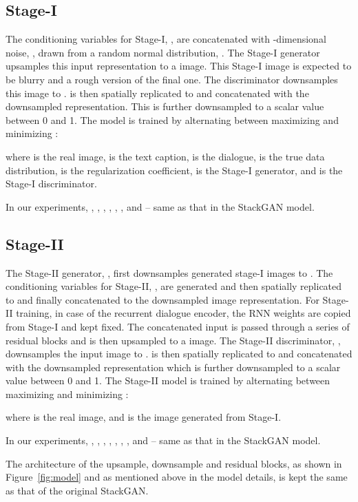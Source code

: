 \documentclass{article}
\begin{document}
\subsection{Stage-I}
The conditioning variables for Stage-I, , are concatenated with -dimensional noise, , drawn from a random normal distribution, . The Stage-I generator upsamples this input representation to a  image. This Stage-I image is expected to be blurry and a rough version of the final one. The discriminator downsamples this image to .  is then spatially replicated to  and concatenated with the downsampled representation. This is further downsampled to a scalar value between 0 and 1. The model is trained by alternating between maximizing  and minimizing :

where  is the real image,  is the text caption,  is the dialogue,  is the true data distribution,  is the regularization coefficient,  is the Stage-I generator, and  is the Stage-I discriminator.

In our experiments, , , , , , , and  -- same as that in the StackGAN model.

\subsection{Stage-II}
The Stage-II generator, , first downsamples generated stage-I images to . The conditioning variables for Stage-II, , are generated and then spatially replicated to  and finally concatenated to the downsampled image representation. For Stage-II training, in case of the recurrent dialogue encoder, the RNN weights are copied from Stage-I and kept fixed. The concatenated input is passed through a series of residual blocks and is then upsampled to a  image. The Stage-II discriminator, , downsamples the input image to .  is then spatially replicated to  and concatenated with the downsampled representation which is further downsampled to a scalar value between 0 and 1. The Stage-II model is trained by alternating between maximizing  and minimizing :

where  is the real image, and  is the image generated from Stage-I.

In our experiments, , , , , , , , and  -- same as that in the StackGAN model.

The architecture of the upsample, downsample and residual blocks, as shown in Figure~\ref{fig:model} and as mentioned above in the model details, is kept the same as that of the original StackGAN.
\end{document}
